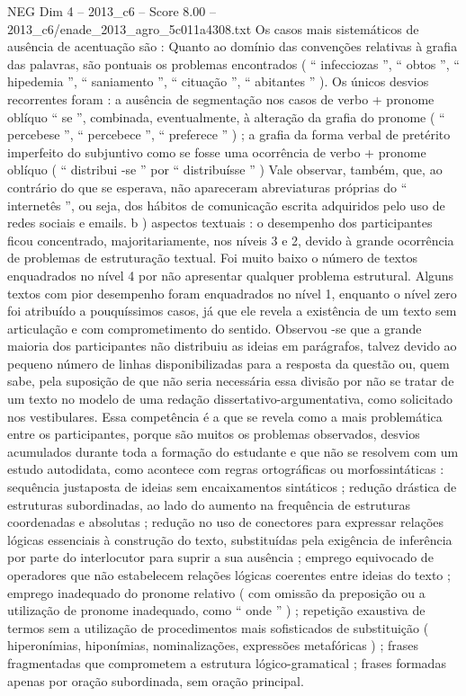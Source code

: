 \begin{textsample}{NEG Dim 4 – 2013\_c6 – Score 8.00 – 2013\_c6/enade\_2013\_agro\_5c011a4308.txt}
Os casos mais sistemáticos de ausência de acentuação são : Quanto ao domínio das convenções relativas à grafia das palavras, são pontuais os problemas encontrados ( “ infecciozas ”, “ obtos ”, “ hipedemia ”, “ saniamento ”, “ cituação ”, “ abitantes ” ).
Os únicos desvios recorrentes foram : a ausência de segmentação nos casos de verbo + pronome oblíquo “ se ”, combinada, eventualmente, à alteração da grafia do pronome ( “ percebese ”, “ percebece ”, “ preferece ” ) ; a grafia da forma verbal de pretérito imperfeito do subjuntivo como se fosse uma ocorrência de verbo + pronome oblíquo ( “ distribui -se ” por “ distribuísse ” ) Vale observar, também, que, ao contrário do que se esperava, não apareceram abreviaturas próprias do “ internetês ”, ou seja, dos hábitos de comunicação escrita adquiridos pelo uso de redes sociais e emails. b ) aspectos textuais : o desempenho dos participantes ficou concentrado, majoritariamente, nos níveis 3 e 2, devido à grande ocorrência de problemas de estruturação textual.
Foi muito baixo o número de textos enquadrados no nível 4 por não apresentar qualquer problema estrutural.
Alguns textos com pior desempenho foram enquadrados no nível 1, enquanto o nível zero foi atribuído a pouquíssimos casos, já que ele revela a existência de um texto sem articulação e com comprometimento do sentido.
Observou -se que a grande maioria dos participantes não distribuiu as ideias em parágrafos, talvez devido ao pequeno número de linhas disponibilizadas para a resposta da questão ou, quem sabe, pela suposição de que não seria necessária essa divisão por não se tratar de um texto no modelo de uma redação dissertativo-argumentativa, como solicitado nos vestibulares.
Essa competência é a que se revela como a mais problemática entre os participantes, porque são muitos os problemas observados, desvios acumulados durante toda a formação do estudante e que não se resolvem com um estudo autodidata, como acontece com regras ortográficas ou morfossintáticas : sequência justaposta de ideias sem encaixamentos sintáticos ; redução drástica de estruturas subordinadas, ao lado do aumento na frequência de estruturas coordenadas e absolutas ; redução no uso de conectores para expressar relações lógicas essenciais à construção do texto, substituídas pela exigência de inferência por parte do interlocutor para suprir a sua ausência ; emprego equivocado de operadores que não estabelecem relações lógicas coerentes entre ideias do texto ; emprego inadequado do pronome relativo ( com omissão da preposição ou a utilização de pronome inadequado, como “ onde ” ) ; repetição exaustiva de termos sem a utilização de procedimentos mais sofisticados de substituição ( hiperonímias, hiponímias, nominalizações, expressões metafóricas ) ; frases fragmentadas que comprometem a estrutura lógico-gramatical ; frases formadas apenas por oração subordinada, sem oração principal.

\end{textsample}
